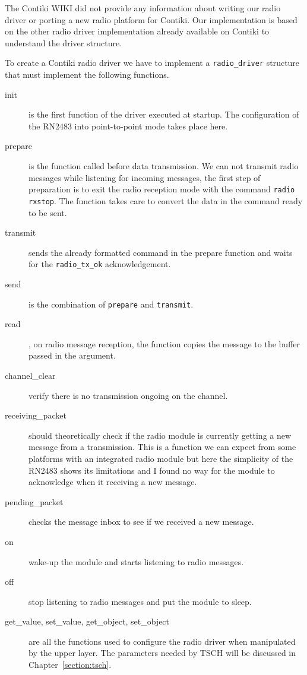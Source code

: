 The Contiki WIKI did not provide any information about writing our radio driver
or porting a new radio platform for Contiki.
Our implementation is based on the other radio driver implementation already
available on Contiki to understand the driver structure.

To create a Contiki radio driver we have to implement a \lstinline{radio_driver}
structure that must implement the following functions.

\begin{description}
  \item[init] is the first function of the driver executed at startup.
    The configuration of the RN2483 into point-to-point mode takes place here.
  \item[prepare] is the function called before data transmission.
    We can not transmit radio messages while listening for incoming messages, the
    first step of preparation is to exit the radio reception mode with the
    command \lstinline{radio rxstop}.
    The function takes care to convert the data in the command ready to be sent.
  \item[transmit] sends the already formatted command in the prepare function and
    waits for the \lstinline{radio_tx_ok} acknowledgement.
  \item[send] is the combination of \lstinline{prepare} and
    \lstinline{transmit}.
  \item[read], on radio message reception, the function copies the
    message to the buffer passed in the argument.
  \item[channel\_clear] verify there is no transmission ongoing on the channel.
  \item[receiving\_packet] should theoretically check if the radio module is
    currently getting a new message from a transmission. This is a function we
    can expect from some platforms with an integrated radio module but here the
    simplicity of the RN2483 shows its limitations and I found no way for the module
    to acknowledge when it receiving a new message.
  \item[pending\_packet] checks the message inbox to see if we received a new
    message.
  \item[on] wake-up the module and starts listening to radio messages.
  \item[off] stop listening to radio messages and put the module to sleep.
  \item[get\_value, set\_value, get\_object, set\_object] are all the functions used
    to configure the radio driver when manipulated by the upper layer.
    The parameters needed by TSCH will be discussed in Chapter~\ref{section:tsch}.
\end{description}


